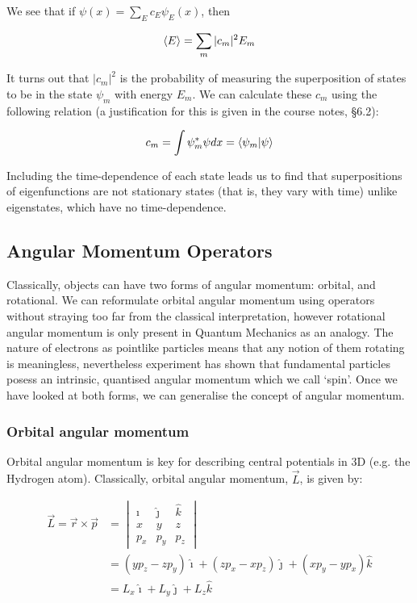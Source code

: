 We see that if $\psi(x) = \sum_E c_E \psi_E(x) $, then 

\[ \expval{E} = \sum_m |c_m|^2E_m \]

It turns out that $|c_m|^2$ is the probability of measuring the superposition of states to be in the state $\psi_m$ with energy $E_m$. We can calculate these $c_m$ using the following relation (a justification for this is given in the course notes, §6.2):

\[ c_m = \int\psi^*_m\psi dx = \bra{\psi_m}\ket{\psi}\]

Including the time-dependence of each state leads us to find that superpositions of eigenfunctions are not stationary states (that is, they vary with time) unlike eigenstates, which have no time-dependence. 

\subsection{Angular Momentum Operators}

Classically, objects can have two forms of angular momentum: orbital, and rotational. We can reformulate orbital angular momentum using operators without straying too far from the classical interpretation, however rotational angular momentum is only present in Quantum Mechanics as an analogy. The nature of electrons as pointlike particles means that any notion of them rotating is meaningless, nevertheless experiment has shown that fundamental particles posess an intrinsic, quantised angular momentum which we call `spin'. Once we have looked at both forms, we can generalise the concept of angular momentum.

\subsubsection*{Orbital angular momentum}

Orbital angular momentum is key for describing central potentials in 3D (e.g. the Hydrogen atom). Classically, orbital angular momentum, $\vec{L}$, is given by:

\begin{align*} \vec{L} = \vec{r} \times \vec{p} &= \begin{vmatrix} \hat{\imath} & \hat{\jmath} & \hat{k} \\ x & y & z \\ p_x & p_y & p_z \end{vmatrix} \\ &= (yp_z - zp_y)\hat{\imath} + (zp_x - xp_z)\hat{\jmath} + (xp_y - yp_x)\hat{k} \\ &= L_x \hat{\imath} + L_y \hat{\jmath} + L_z \hat{k} 
\end{align*}

